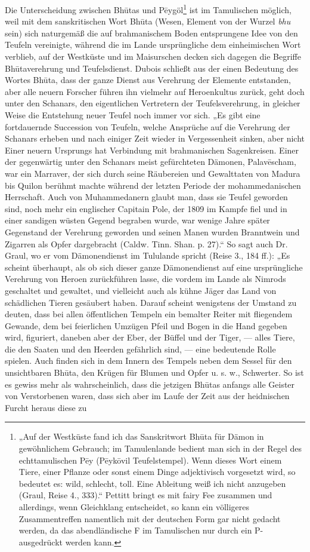 \documentclass{article}
\begin{document}
Die Unterscheidung zwischen Bh\={u}tas und P\={e}ygöl\footnote{„Auf der Westküste fand ich das Sanskritwort Bh\={u}ta für Dämon in gewöhnlichem Gebrauch; im Tamulenlande bedient man sich in der Regel des echttamulischen P\={e}y (P\={e}yk\={o}vil Teufelstempel). Wenn dieses Wort einem Tiere, einer Pflanze oder sonst einem Dinge adjektivisch vorgesetzt wird, so bedeutet es: wild, schlecht, toll. Eine Ableitung weiß ich nicht anzugeben (Graul, Reise 4., 333).“ Pettitt bringt es mit fairy Fee zusammen und allerdings, wenn Gleichklang entscheidet, so kann ein völligeres Zusammentreffen namentlich mit der deutschen Form gar nicht gedacht werden, da das abendländische F im Tamulischen nur durch ein P-ausgedrückt werden kann.} ist im Tamulischen möglich, weil mit dem sanskritischen Wort Bh\={u}ta (Wesen, Element von der Wurzel \emph{bhu} sein) sich naturgemäß die auf brahmanischem Boden entsprungene Idee von den Teufeln vereinigte, während die im Lande ursprüngliche dem einheimischen Wort verblieb, auf der Westküste und im Maisurschen decken sich dagegen die Begriffe Bh\={u}taverehrung und Teufelsdienst. Dubois schließt aus der einen Bedeutung des Wortes Bh\={u}ta, dass der ganze Dienst aus Verehrung der Elemente entstanden, aber alle neuern Forscher führen ihn vielmehr auf Heroenkultus zurück, geht doch unter den Schanars, den eigentlichen Vertretern der Teufelsverehrung, in gleicher Weise die Entstehung neuer Teufel noch immer vor sich. „Es gibt eine fortdauernde Succession von Teufeln, welche Ansprüche auf die Verehrung der Schanars erheben und nach einiger Zeit wieder in Vergessenheit sinken, aber nicht Einer neuern Ursprungs hat Verbindung mit brahmanischen Sagenkreisen. Einer der gegenwärtig unter den Schanars meist gefürchteten Dämonen, Palav\={e}scham, war ein Marraver, der sich durch seine Räubereien und Gewalttaten von Madura bis Quilon berühmt machte während der letzten Periode der mohammedanischen Herrschaft. Auch von Muhammedanern glaubt man, dass sie Teufel geworden sind, noch mehr ein englischer Capitain Pole, der 1809 im Kampfe fiel und in einer sandigen wüsten Gegend begraben wurde, war wenige Jahre später Gegenstand der Verehrung geworden und seinen Manen wurden Branntwein und Zigarren als Opfer dargebracht (Caldw. Tinn. Shan. p. 27).“ So sagt auch Dr. Graul, wo er vom Dämonendienst im Tululande spricht (Reise 3., 184 ff.): „Es scheint überhaupt, als ob sich dieser ganze Dämonendienst auf eine ursprüngliche Verehrung von Heroen zurückführen lasse, die vordem im Lande als Nimrods geschaltet und gewaltet, und vielleicht auch als kühne Jäger das Land von schädlichen Tieren gesäubert haben. Darauf scheint wenigstens der Umstand zu deuten, dass bei allen öffentlichen Tempeln ein bemalter Reiter mit fliegendem Gewande, dem bei feierlichen Umzügen Pfeil und Bogen in die Hand gegeben wird, figuriert, daneben aber der Eber, der Büffel und der Tiger, — alles Tiere, die den Saaten und den Heerden gefährlich sind, — eine bedeutende Rolle spielen. Auch finden sich in dem Innern des Tempels neben dem Sessel für den unsichtbaren Bh\={u}ta, den Krügen für Blumen und Opfer u. s. w., Schwerter. So ist es gewiss mehr als wahrscheinlich, dass die jetzigen Bh\={u}tas anfangs alle Geister von Verstorbenen waren, dass sich aber im Laufe der Zeit aus der heidnischen Furcht heraus diese zu 
\end{document}
